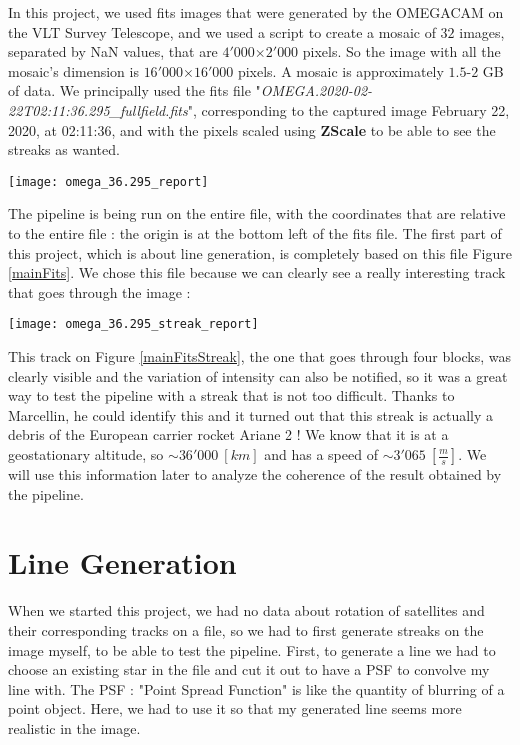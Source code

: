\documentclass[a4paper,12pt,oneside]{report}
\begin{document}
In this project, we used fits images that were generated by the OMEGACAM on the VLT Survey Telescope, and we used a script to create a 
mosaic of $32$ images, separated by NaN values, that are $4'000$$\times$$2'000$ pixels. So the image with all the mosaic's dimension is $16'000$$\times$$16'000$ pixels. 
A mosaic is approximately $1.5$-$2$ GB of data. 
\newline
We principally used the fits file "\emph{OMEGA.2020-02-22T02:11:36.295\_fullfield.fits}", corresponding to the
captured image February 22, 2020, at 02:11:36, and with the pixels scaled using \textbf{ZScale} to be able to see the streaks as wanted.
\newline
\begin{center}
    \texttt{[image: omega\_36.295\_report]}
    \label{mainFits}
\end{center}
The pipeline is being run on the entire file, with the coordinates that are relative to the entire file : the origin is at the bottom left of
the fits file. The first part of this project, which is about line generation, is completely based on this file Figure \ref{mainFits}. We chose
this file because we can clearly see a really interesting track that goes through the image :
\begin{center}
    \texttt{[image: omega\_36.295\_streak\_report]}
    \label{mainFitsStreak}
\end{center}
This track on Figure \ref{mainFitsStreak}, the one that goes through four blocks, was clearly visible and the variation of intensity can also be notified, 
so it was a great way to test the pipeline with a streak that is not too difficult. Thanks to Marcellin, he could identify this and it turned out that 
this streak is actually a debris of the European carrier rocket Ariane 2 ! We know that it is at a geostationary altitude, 
so $\sim 36'000\ [km]$ and has a speed of $\sim 3'065\ [\frac{m}{s}]$. We will use this information later to analyze the coherence 
of the result obtained by the pipeline.

\chapter{Line Generation}

When we started this project, we had no data about rotation of satellites and their corresponding tracks on a file, so we had to first 
generate streaks on the image myself, to be able to test the pipeline. First, to generate a line we had to choose an existing star in the file
and cut it out to have a PSF to convolve my line with. The PSF : "Point Spread Function" is like the quantity of blurring of a point object.
Here, we had to use it so that my generated line seems more realistic in the image. 
\end{document}

